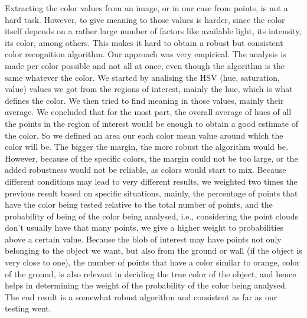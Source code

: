 Extracting the color values from an image, or in our case from points, is not a hard task. 
However, to give meaning to those values is harder, since the color itself depends on a rather large number of factors like available light, its intensity, its color, among others.
This makes it hard to obtain a robust but consistent color recognition algorithm.
Our approach was very empirical. The analysis is made per color possible and not all at once, even though the algorithm is the same whatever the color.
We started by analising the HSV (hue, saturation, value) values we got from the regions of interest, mainly the hue, which is what defines the color. 
We then tried to find meaning in those values, mainly their average.
We concluded that for the most part, the overall average of hues of all the points in the region of interest would be enough to obtain a good estimate of the color. 
So we defined an area our each color mean value around which the color will be.
The bigger the margin, the more robust the algorithm would be.
However, because of the specific colors, the margin could not be too large, or the added robustness would not be reliable, as colors would start to mix.
Because different conditions may lead to very different results, we weighted two times the previous result based on specific situations, mainly, the percentage of points that have the color being tested relative to the total number of points, and the probability of being of the color being analysed, i.e., considering the point clouds don't usually have that many points, we give a higher weight to probabilities above a certain value.
Because the blob of interest may have points not only belonging to the object we want, but also from the ground or wall (if the object is very close to one), the number of points that have a color similar to orange, color of the ground, is also relevant in deciding the true color of the object, and hence helps in determining the weight of the probability of the color being analysed.
The end result is a somewhat robust algorithm and consistent as far as our testing went. 
